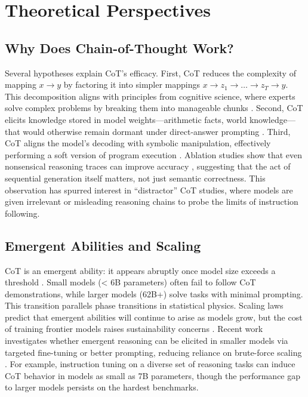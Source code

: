 \documentclass[11pt,a4paper]{article}
\begin{document}
\section{Theoretical Perspectives}
\label{sec:theory}
\subsection{Why Does Chain-of-Thought Work?}
Several hypotheses explain CoT's efficacy. First, CoT reduces the complexity of mapping $x \to y$ by factoring it into simpler mappings $x \to z_1 \to \dots \to z_T \to y$. This decomposition aligns with principles from cognitive science, where experts solve complex problems by breaking them into manageable chunks \citep{chi1986self}. Second, CoT elicits knowledge stored in model weights---arithmetic facts, world knowledge---that would otherwise remain dormant under direct-answer prompting \citep{wei2022chain}. Third, CoT aligns the model's decoding with symbolic manipulation, effectively performing a soft version of program execution \citep{gao2023pal}. Ablation studies show that even nonsensical reasoning traces can improve accuracy \citep{ye2022unreliability}, suggesting that the act of sequential generation itself matters, not just semantic correctness. This observation has spurred interest in ``distractor'' CoT studies, where models are given irrelevant or misleading reasoning chains to probe the limits of instruction following.

\subsection{Emergent Abilities and Scaling}
CoT is an emergent ability: it appears abruptly once model size exceeds a threshold \citep{wei2022emergent}. Small models (< 6B parameters) often fail to follow CoT demonstrations, while larger models (62B+) solve tasks with minimal prompting. This transition parallels phase transitions in statistical physics. Scaling laws \citep{rae2021scaling} predict that emergent abilities will continue to arise as models grow, but the cost of training frontier models raises sustainability concerns \citep{srivastava2022beyond}. Recent work investigates whether emergent reasoning can be elicited in smaller models via targeted fine-tuning or better prompting, reducing reliance on brute-force scaling \citep{chung2022scaling}. For example, instruction tuning on a diverse set of reasoning tasks can induce CoT behavior in models as small as 7B parameters, though the performance gap to larger models persists on the hardest benchmarks.
\end{document}
